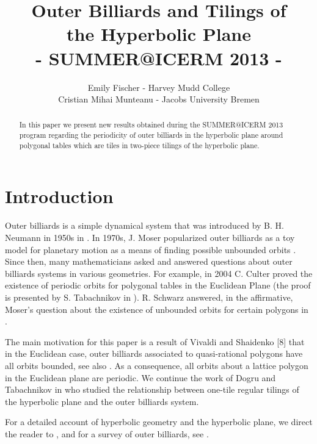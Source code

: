 \documentclass[11pt, oneside]{article}   	%
\title{Outer Billiards and Tilings of \\ the Hyperbolic Plane \\ - SUMMER@ICERM 2013 -}
\author{Emily Fischer - Harvey Mudd College \\ Cristian Mihai Munteanu - Jacobs University Bremen}
\date{}
\begin{document}
\maketitle
\begin{abstract}
In this paper we present new results obtained during the SUMMER@ICERM 2013 program regarding the periodicity of outer billiards in the hyperbolic plane around polygonal tables which are tiles in two-piece tilings of the hyperbolic plane.
\end{abstract}
\section{Introduction}

\indent \indent Outer billiards is a simple dynamical system that was  introduced  by B. H. Neumann in 1950s in \cite{neumann}. In 1970s, J. Moser popularized outer billiards as a toy model for planetary motion as a means of finding possible unbounded orbits \cite{moser1,moser}. Since then, many mathematicians asked and answered questions about outer billiards systems in various geometries. For example, in 2004 C. Culter proved the existence of periodic orbits for polygonal tables in the Euclidean Plane (the proof is presented by S. Tabachnikov in  \cite{culter}).  R. Schwarz answered, in the affirmative, Moser's question about the existence of unbounded orbits for certain polygons in \cite{schwartz1,schwartz}. 

The main motivation for this paper is a result of Vivaldi and Shaidenko [8] that in the Euclidean case, outer billiards associated to quasi-rational polygons have  all orbits  bounded, see also \cite{Ko,GS}. As a consequence, all orbits about a lattice polygon in the Euclidean plane are periodic.
We continue the work of Dogru and Tabachnikov in \cite{dogtab} who studied the relationship between one-tile regular tilings of the hyperbolic plane and the outer billiards system. 

 For a detailed account of hyperbolic geometry and the hyperbolic plane, we direct the reader to  \cite{hyperbolic}, and for a survey of outer billiards, see \cite{dogtab1,Tab}.
\end{document}
